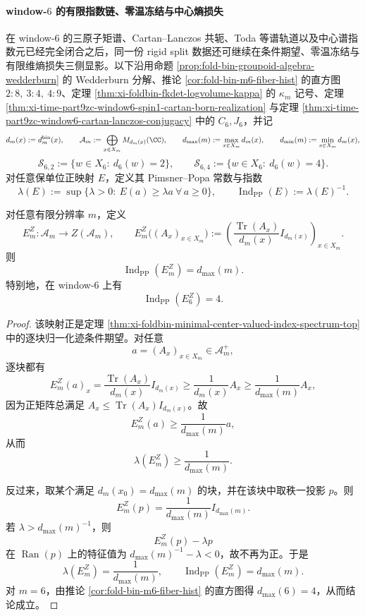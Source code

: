 \paragraph{window-\texorpdfstring{$6$}{6} 的有限指数链、零温冻结与中心熵损失}
在 window-\(6\) 的三原子矩谱、Cartan--Lanczos 共轭、Toda 等谱轨道以及中心谱指数元已经完全闭合之后，同一份 rigid split 数据还可继续在条件期望、零温冻结与有限维熵损失三侧显影。以下沿用命题 \ref{prop:fold-bin-groupoid-algebra-wedderburn} 的 Wedderburn 分解、推论 \ref{cor:fold-bin-m6-fiber-hist} 的直方图 \(2:8,\ 3:4,\ 4:9\)、定理 \ref{thm:xi-foldbin-fkdet-logvolume-kappa} 的 \(\kappa_m\) 记号、定理 \ref{thm:xi-time-part9zc-window6-spin1-cartan-born-realization} 与定理 \ref{thm:xi-time-part9zc-window6-cartan-lanczos-conjugacy} 中的 \(C_6,J_6\)，并记
\[
d_m(x):=d_m^{\mathrm{bin}}(x),
\qquad
\mathcal A_m:=\bigoplus_{x\in X_m}M_{d_m(x)}(\CC),
\qquad
d_{\max}(m):=\max_{x\in X_m}d_m(x),
\qquad
d_{\min}(m):=\min_{x\in X_m}d_m(x),
\]
\[
\mathcal S_{6,2}:=\{w\in X_6:\ d_6(w)=2\},
\qquad
\mathcal S_{6,4}:=\{w\in X_6:\ d_6(w)=4\}.
\]
对任意保单位正映射 \(E\)，定义其 Pimsner--Popa 常数与指数
\[
\lambda(E):=\sup\{\lambda>0:\ E(a)\ge \lambda a\ \forall\,a\ge 0\},
\qquad
\operatorname{Ind}_{\mathrm{PP}}(E):=\lambda(E)^{-1}.
\]

\begin{theorem}\label{thm:xi-time-part9ze-center-condexp-pimsner-popa-index}
对任意有限分辨率 \(m\)，定义
\[
E_m^Z:\mathcal A_m\to Z(\mathcal A_m),
\qquad
E_m^Z\bigl((A_x)_{x\in X_m}\bigr)
:=
\left(
\frac{\operatorname{Tr}(A_x)}{d_m(x)}I_{d_m(x)}
\right)_{x\in X_m}.
\]
则
\[
\operatorname{Ind}_{\mathrm{PP}}(E_m^Z)=d_{\max}(m).
\]
特别地，在 window-\(6\) 上有
\[
\operatorname{Ind}_{\mathrm{PP}}(E_6^Z)=4.
\]
\end{theorem}
\begin{proof}
该映射正是定理 \ref{thm:xi-foldbin-minimal-center-valued-index-spectrum-top} 中的逐块归一化迹条件期望。对任意
\[
a=(A_x)_{x\in X_m}\in \mathcal A_m^+,
\]
逐块都有
\[
E_m^Z(a)_x
=
\frac{\operatorname{Tr}(A_x)}{d_m(x)}I_{d_m(x)}
\ge
\frac{1}{d_m(x)}A_x
\ge
\frac{1}{d_{\max}(m)}A_x,
\]
因为正矩阵总满足 \(A_x\le \operatorname{Tr}(A_x)I_{d_m(x)}\)。故
\[
E_m^Z(a)\ge \frac{1}{d_{\max}(m)}a,
\]
从而
\[
\lambda(E_m^Z)\ge \frac{1}{d_{\max}(m)}.
\]

反过来，取某个满足 \(d_m(x_0)=d_{\max}(m)\) 的块，并在该块中取秩一投影 \(p\)。则
\[
E_m^Z(p)=\frac{1}{d_{\max}(m)}I_{d_{\max}(m)}.
\]
若 \(\lambda>d_{\max}(m)^{-1}\)，则
\[
E_m^Z(p)-\lambda p
\]
在 \(\operatorname{Ran}(p)\) 上的特征值为 \(d_{\max}(m)^{-1}-\lambda<0\)，故不再为正。于是
\[
\lambda(E_m^Z)=\frac{1}{d_{\max}(m)},
\qquad
\operatorname{Ind}_{\mathrm{PP}}(E_m^Z)=d_{\max}(m).
\]
对 \(m=6\)，由推论 \ref{cor:fold-bin-m6-fiber-hist} 的直方图得 \(d_{\max}(6)=4\)，从而结论成立。
\end{proof}

